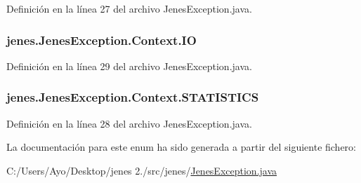 Definición en la línea 27 del archivo Jenes\-Exception.\-java.

\hypertarget{enumjenes_1_1_jenes_exception_1_1_context_a023d03d781868c33bd25415d7c5602d0}{
\subsubsection[{I\-O}]{\setlength{\rightskip}{0pt plus 5cm}jenes.\-Jenes\-Exception.\-Context.\-I\-O}}\label{enumjenes_1_1_jenes_exception_1_1_context_a023d03d781868c33bd25415d7c5602d0}


Definición en la línea 29 del archivo Jenes\-Exception.\-java.

\hypertarget{enumjenes_1_1_jenes_exception_1_1_context_ae0335a1dcf69b5493fac24c4c2c25cd1}{
\subsubsection[{S\-T\-A\-T\-I\-S\-T\-I\-C\-S}]{\setlength{\rightskip}{0pt plus 5cm}jenes.\-Jenes\-Exception.\-Context.\-S\-T\-A\-T\-I\-S\-T\-I\-C\-S}}\label{enumjenes_1_1_jenes_exception_1_1_context_ae0335a1dcf69b5493fac24c4c2c25cd1}


Definición en la línea 28 del archivo Jenes\-Exception.\-java.



La documentación para este enum ha sido generada a partir del siguiente fichero\-:\begin{DoxyCompactItemize}
\item 
C\-:/\-Users/\-Ayo/\-Desktop/jenes 2./src/jenes/\hyperlink{_jenes_exception_8java}{Jenes\-Exception.\-java}\end{DoxyCompactItemize}
